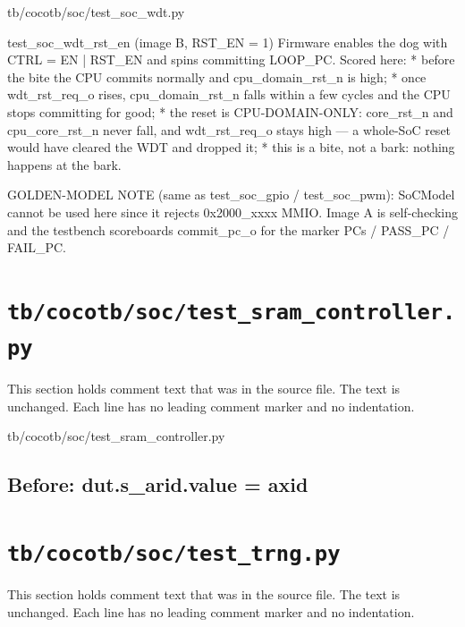 \begin{relocated}{tb/cocotb/soc/test_soc_wdt.py}
\begin{textblock}
test_soc_wdt_rst_en  (image B, RST_EN = 1)
Firmware enables the dog with CTRL = EN | RST_EN and spins committing LOOP_PC. Scored here:
* before the bite the CPU commits normally and cpu_domain_rst_n is high;
* once wdt_rst_req_o rises, cpu_domain_rst_n falls within a few cycles and the CPU stops
committing for good;
* the reset is CPU-DOMAIN-ONLY: core_rst_n and cpu_core_rst_n never fall, and wdt_rst_req_o
stays high — a whole-SoC reset would have cleared the WDT and dropped it;
* this is a bite, not a bark: nothing happens at the bark.

GOLDEN-MODEL NOTE (same as test_soc_gpio / test_soc_pwm): SoCModel cannot be used here since it
rejects 0x2000_xxxx MMIO. Image A is self-checking and the testbench scoreboards commit_pc_o for
the marker PCs / PASS_PC / FAIL_PC.
\end{textblock}

\end{relocated}

\section{\texttt{tb/cocotb/soc/test\_sram\_controller.py}}\label{tm:suite:soc-test-sram-controller}

This section holds comment text that was in the source file. The text is unchanged. Each line has no leading comment marker and no indentation.

\begin{relocated}{tb/cocotb/soc/test_sram_controller.py}

\subsection*{Before: dut.s\_arid.value    = axid}


\end{relocated}

\section{\texttt{tb/cocotb/soc/test\_trng.py}}\label{tm:suite:soc-test-trng}

This section holds comment text that was in the source file. The text is unchanged. Each line has no leading comment marker and no indentation.

